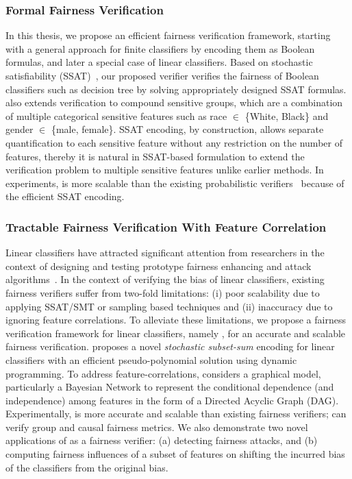 \subsubsection{Formal Fairness Verification} In this thesis, we propose an efficient fairness verification framework, starting with a general approach for finite classifiers by encoding them as Boolean formulas, and later a special case of linear classifiers. Based on stochastic satisfiability (SSAT)~\cite{littman2001stochastic}, our proposed verifier {\justicia} verifies the fairness of Boolean classifiers such as decision tree by solving appropriately designed SSAT formulas. {\justicia} also extends verification to compound sensitive groups, which are a combination of multiple categorical sensitive features such as race $ \in $ \{White, Black\} and gender $ \in $ \{male, female\}. SSAT encoding, by construction, allows separate quantification to each sensitive feature without any restriction on the number of features, thereby it is natural in SSAT-based formulation to extend the verification problem to multiple sensitive features unlike earlier methods. In experiments, {\justicia} is more scalable than the existing probabilistic verifiers~\cite{albarghouthi2017fairsquare,bastani2019probabilistic} because of the efficient SSAT encoding.


\subsubsection{Tractable Fairness Verification With Feature Correlation} Linear classifiers have attracted significant attention from researchers in the context of designing and testing prototype fairness enhancing and attack algorithms~\cite{pleiss2017fairness,zafar2017fairness,dressel2018accuracy, john2020verifying}. In the context of verifying the bias of linear classifiers, existing fairness verifiers suffer from two-fold limitations: (i) poor scalability due to applying SSAT/SMT or sampling based techniques and (ii) inaccuracy due to ignoring feature correlations. To alleviate these limitations, we propose a fairness verification framework for linear classifiers, namely {\fvgm}, for an accurate and scalable fairness verification. {\fvgm} proposes a novel \textit{stochastic subset-sum} encoding for linear classifiers with an efficient pseudo-polynomial solution using dynamic programming. To address feature-correlations, {\fvgm} considers a graphical model, particularly a Bayesian Network to represent the conditional dependence (and independence) among features in the form of a Directed Acyclic Graph (DAG). Experimentally,  {\fvgm} is more accurate and scalable than existing fairness verifiers; {\fvgm} can verify group and causal fairness metrics. We also demonstrate two novel applications of {\fvgm} as a fairness verifier: (a) detecting fairness attacks, and (b) computing fairness influences of a subset of features on shifting the incurred bias of the classifiers from the original bias.



